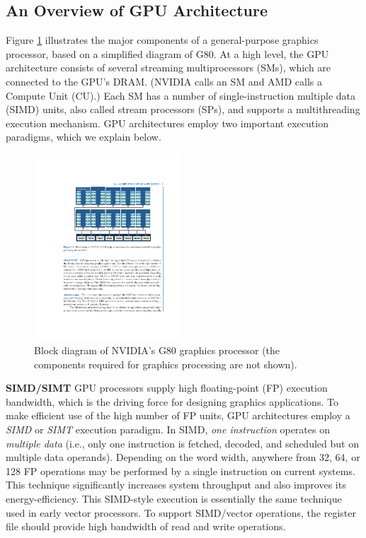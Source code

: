 \documentclass[twocolumn]{article}
\begin{document}
\subsection{An Overview of GPU Architecture}
Figure \ref{fig:nvidia-g80} illustrates the major components of a general-purpose graphics processor, based on a simplified diagram of G80. At a high level, the GPU architecture consists of several streaming multiprocessors (SMs), which are connected to the GPU’s DRAM. (NVIDIA calls an SM and AMD calls a Compute Unit (CU).) Each SM has a number of single-instruction multiple data (SIMD) units, also called stream processors (SPs), and supports a multithreading execution mechanism. GPU architectures employ two important execution paradigms, which we explain below.
\begin{figure}[htb]
        \centering
        \includegraphics[width=0.48\textwidth]{nvidia-g80.pdf}
        \caption{Block diagram of NVIDIA’s G80 graphics processor (the components required for graphics processing are not shown).}
        \label{fig:nvidia-g80}
\end{figure}

\noindent
\textbf{SIMD/SIMT} 
GPU processors supply high floating-point (FP) execution bandwidth, which is the driving force for designing graphics applications. To make efficient use of the high number of FP units, GPU architectures employ a \textit{SIMD} or \textit{SIMT} execution paradigm. In SIMD, \textit{one instruction} operates on \textit{multiple data} (i.e., only one instruction is fetched, decoded, and scheduled but on multiple data operands). Depending on the word width, anywhere from 32, 64, or 128 FP operations may be performed by a single instruction on current systems. This technique significantly increases system throughput and also improves its energy-efficiency. This SIMD-style execution is essentially the same technique used in early vector processors. To support SIMD/vector operations, the register file should provide high bandwidth of read and write operations.
\end{document}
